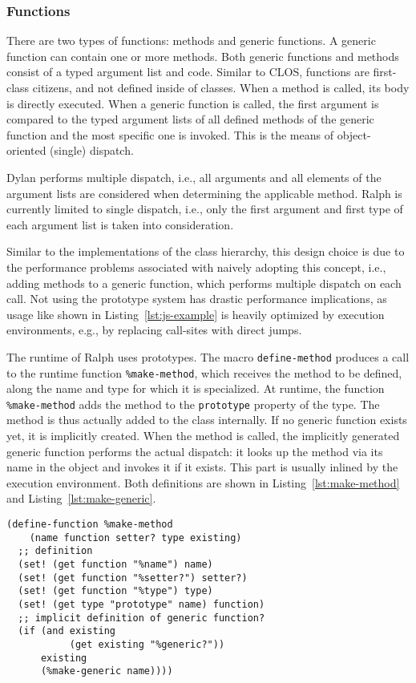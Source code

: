 \documentclass{acm_proc_article-sp}
\begin{document}
\subsubsection{Functions}

There are two types of functions: methods and generic functions. A
generic function can contain one or more methods. Both generic
functions and methods consist of a typed argument list and
code. Similar to CLOS, functions are first-class citizens, and not
defined inside of classes. When a method is called, its body is
directly executed. When a generic function is called, the first argument
is compared to the typed argument lists of all defined methods of the
generic function and the most specific one is invoked. This is the
means of object-oriented (single) dispatch.

Dylan performs multiple dispatch, i.e., all arguments and all elements
of the argument lists are considered when determining the applicable
method. Ralph is currently limited to single dispatch, i.e., only the
first argument and first type of each argument list is taken into
consideration.

Similar to the implementations of the class hierarchy, this design
choice is due to the performance problems associated with naively
adopting this concept, i.e., adding methods to a generic function,
which performs multiple dispatch on each call. Not using the prototype
system has drastic performance implications, as usage like shown in
Listing~\ref{lst:js-example} is heavily optimized by execution
environments, e.g., by replacing call-sites with direct jumps.

The runtime of Ralph uses prototypes. The macro \texttt{define-method}
produces a call to the runtime function \texttt{\%make-method}, which
receives the method to be defined, along the name and type for which
it is specialized. At runtime, the function \texttt{\%make-method}
adds the method to the \texttt{prototype} property of the type. The
method is thus actually added to the class internally. If no generic
function exists yet, it is implicitly created. When the method is
called, the implicitly generated generic function performs the actual
dispatch: it looks up the method via its name in the object and
invokes it if it exists. This part is usually inlined by the execution
environment. Both definitions are shown in
Listing~\ref{lst:make-method} and Listing~\ref{lst:make-generic}.

\begin{lstlisting}[label=lst:make-method,
    caption=Definition of \texttt{\%make-method}
]
(define-function %make-method
    (name function setter? type existing)
  ;; definition
  (set! (get function "%name") name)
  (set! (get function "%setter?") setter?)
  (set! (get function "%type") type)
  (set! (get type "prototype" name) function)
  ;; implicit definition of generic function?
  (if (and existing
           (get existing "%generic?"))
      existing
      (%make-generic name))))
\end{lstlisting}
\end{document}
